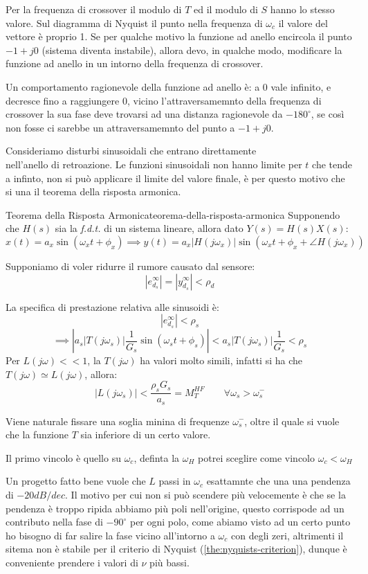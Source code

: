 \documentclass[12pt]{article}
\begin{document}
Per la frequenza di crossover il modulo di $T$ ed il modulo di $S$ hanno lo stesso valore. Sul diagramma di Nyquist il punto nella frequenza di $\omega_c$ il valore del vettore \`e proprio 1. Se per qualche motivo la funzione ad anello encircola il punto $-1+j0$ (sistema diventa instabile), allora devo, in qualche modo, modificare la funzione ad anello in un intorno della frequenza di crossover.

Un comportamento ragionevole della funzione ad anello \`e: a 0 vale infinito, e decresce fino a raggiungere 0, vicino l'attraversamemnto della frequenza di crossover la sua fase deve trovarsi ad una distanza ragionevole da $-180^{\circ}$, se cos\`i non fosse ci sarebbe un attraversamemnto del punto a $-1+j0$.

Consideriamo disturbi sinusoidali che entrano direttamente \\ nell'anello di retroazione. Le funzioni sinusoidali non hanno limite per $t$ che tende a infinto, non si pu\`o applicare il limite del valore finale, \`e per questo motivo che si una il teorema della risposta armonica.
\begin{theorem}{Teorema della Risposta Armonica}{teorema-della-risposta-armonica}
    Supponendo che $H(s)$ sia la \emph{f.d.t.} di un sistema lineare, allora dato $Y(s) = H(s)X(s)$:
    \[ x(t) = a_x\sin(\omega_xt + \phi_x) \implies y(t) = a_x |H(j\omega_x)| \sin(\omega_xt + \phi_x + \angle H(j\omega_x)) \]
\end{theorem}

Supponiamo di voler ridurre il rumore causato dal sensore:
\[ |e _{d_s}^{\infty}| = \left| y _{d_s}^{\infty} \right| < \rho_d \]

La specifica di prestazione relativa alle sinusoidi \`e:
\[ \left| e_{d_s}^{\infty} \right| < \rho_s   \]
\[ \implies \left| a_s |T(j\omega_s)|\frac{1}{G_s} \sin(\omega_st + \phi_s) \right| < a_s |T(j\omega_s)|\frac{1}{G_s} < \rho_s \]
Per $L(j\omega) << 1$, la $T(j\omega)$ ha valori molto simili, infatti si ha che $T(j\omega) \simeq L(j\omega)$, allora:
\[ \boxed{|L(j\omega_s)| < \frac{\rho_sG_s}{a_s} = M_T^{HF} \qquad \forall \omega_s > \omega_s^{-}} \]

Viene naturale fissare una soglia minina di frequenze $\omega_s^{-}$, oltre il quale si vuole che la funzione $T$ sia inferiore di un certo valore.

Il primo vincolo \`e quello su $\omega_c$, definta la $\omega_H$ potrei sceglire come vincolo $\omega_c < \omega_H$

Un progetto fatto bene vuole che $L$ passi in $\omega_c$ esattamnte che una una pendenza di $-20dB/dec$. Il motivo per cui non si pu\`o scendere pi\`u velocemente \`e che se la pendenza \`e troppo ripida abbiamo pi\`u poli nell'origine, questo corrispode ad un contributo nella fase di $-90^{\circ}$ per ogni polo, come abiamo visto ad un certo punto ho bisogno di far salire la fase vicino all'intorno a $\omega_c$ con degli zeri, altrimenti il sitema non \`e stabile per il criterio di Nyquist (\ref{the:nyquists-criterion}), dunque \`e conveniente prendere i valori di $\nu$ pi\`u bassi.
\end{document}
